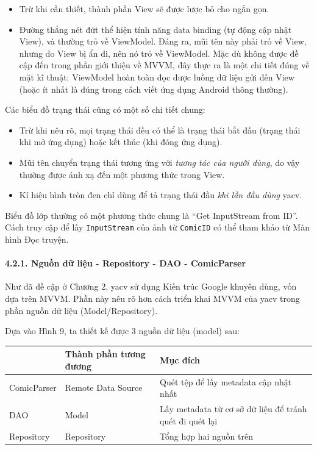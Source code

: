 \documentclass[
]{article}
\begin{document}
\begin{itemize}
\item
  Trừ khi cần thiết, thành phần View sẽ được lược bỏ cho ngắn gọn.
\item
  Đường thẳng nét đứt thể hiện tính năng data binding (tự động cập nhật
  View), và thường trỏ về ViewModel. Đáng ra, mũi tên này phải trỏ về
  View, nhưng do View bị ẩn đi, nên nó trỏ về ViewModel. Mặc dù không
  được đề cập đến trong phần giới thiệu về MVVM, đây thực ra là một chi
  tiết đúng về mặt kĩ thuật: ViewModel hoàn toàn đọc được luồng dữ liệu
  gửi đến View (hoặc ít nhất là đúng trong cách viết ứng dụng Android
  thông thường).
\end{itemize}

Các biểu đồ trạng thái cũng có một số chi tiết chung:

\begin{itemize}
\item
  Trừ khi nêu rõ, mọi trạng thái đều có thể là trạng thái bắt đầu (trạng
  thái khi mở ứng dụng) hoặc kết thúc (khi đóng ứng dụng).
\item
  Mũi tên chuyển trạng thái tương ứng với \emph{tương tác của người
  dùng}, do vậy thường được ánh xạ đến một phương thức trong View.
\item
  Kí hiệu hình tròn đen chỉ dùng để tả trạng thái đầu \emph{khi lần đầu
  dùng} yacv.
\end{itemize}

Biểu đồ lớp thường có một phương thức chung là ``Get InputStream from
ID''. Cách truy cập để lấy \texttt{InputStream} của ảnh từ
\texttt{ComicID} có thể tham khảo từ Màn hình Đọc truyện.

\hypertarget{nguux1ed3n-dux1eef-liux1ec7u---repository---dao---comicparser}{%
\paragraph{\texorpdfstring{4.2.1. Nguồn dữ liệu - Repository - DAO -
ComicParser
}{4.2.1. Nguồn dữ liệu - Repository - DAO - ComicParser }}\label{nguux1ed3n-dux1eef-liux1ec7u---repository---dao---comicparser}}

Như đã đề cập ở Chương 2, yacv sử dụng Kiến trúc Google khuyên dùng, vốn
dựa trên MVVM. Phần này nêu rõ hơn cách triển khai MVVM của yacv trong
phần nguồn dữ liệu (Model/Repository).

Dựa vào Hình 9, ta thiết kế được 3 nguồn dữ liệu (model) sau:

\begin{longtable}[]{@{}lll@{}}
\toprule
& Thành phần tương đương & Mục đích \\
\midrule
\endhead
ComicParser & Remote Data Source & Quét tệp để lấy metadata cập nhật
nhất \\
DAO & Model & Lấy metadata từ cơ sở dữ liệu để tránh quét đi quét lại \\
Repository & Repository & Tổng hợp hai nguồn trên \\
\bottomrule
\end{longtable}
\end{document}
